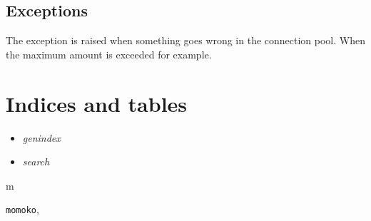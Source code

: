 \documentclass[letterpaper,10pt,english]{sphinxmanual}
\begin{document}
\section{Exceptions}
\label{api:id14}

\begin{fulllineitems}
\label{api:momoko.PoolError}
The  exception is raised when something goes wrong in the connection
pool. When the maximum amount is exceeded for example.

\end{fulllineitems}



\chapter{Indices and tables}
\label{index:indices-and-tables}\begin{itemize}
\item {} 
\emph{genindex}

\item {} 
\emph{search}

\end{itemize}


\renewcommand{\indexname}{Python Module Index}
\begin{theindex}
\def\bigletter#1{{\Large\sffamily#1}\nopagebreak\vspace{1mm}}
\bigletter{m}
\item {\texttt{momoko}}, \pageref{api:module-momoko}
\end{theindex}

\renewcommand{\indexname}{Index}
\printindex
\end{document}
